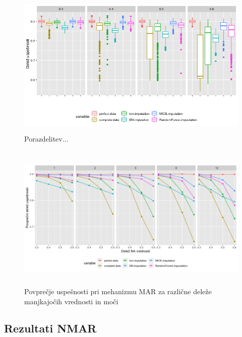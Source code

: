 \documentclass[12pt,a4paper]{article}
\begin{document}
\begin{figure}[ht]
	\centering
	\includegraphics[width= 12cm, height = 7cm]{img/MAR_boxplot.png}
	\caption{Porazdelitev...} 
	\label{fig:5}
\end{figure}


\begin{figure}[ht]
	\centering
	\includegraphics[width= 12cm, height = 7cm]{img/MAR_line_mean.png}
	\caption{Povprečje uspešnosti pri mehanizmu MAR za različne deleže manjkajočih vrednosti in moči} 
	\label{fig:6}
\end{figure}

\pagebreak

\subsection{Rezultati NMAR}
\end{document}
